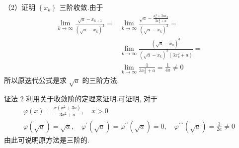 \begin{tcolorbox}[enhanced,colback=8,colframe=7,breakable,coltitle=green!25!black,title=2024]
（2）证明 $ \left\{x_{k}\right\} $ 三阶收敛.由于
$$
\begin{aligned}
\lim _{k \rightarrow \infty} \frac{\sqrt{a}-x_{k+1}}{\left(\sqrt{a}-x_{k}\right)^{3}}= & \lim _{k \rightarrow \infty} \frac{\sqrt{a}-\frac{x_{k}^{3}+3 a x_{k}}{3 x_{k}^{2}+a}}{\left(\sqrt{a}-x_{k}\right)^{3}}= \\
& \lim _{k \rightarrow \infty} \frac{\left(\sqrt{a}-x_{k}\right)^{3}}{\left(\sqrt{a}-x_{k}\right)^{3}\left(3 x_{k}^{2}+a\right)}= \\
& \lim _{k \rightarrow \infty} \frac{1}{3 x_{k}^{2}+a}=\frac{1}{4 a} \neq 0
\end{aligned}
$$
所以原迭代公式是求 $ \sqrt{a} $ 的三阶方法.

证法 2 \; 利用关于收敛阶的定理来证明.可证明, 对于
$$
\begin{array}{c}
\varphi(x)=\frac{x\left(x^{2}+3 a\right)}{3 x^{2}+a}, \quad x>0 \\
\varphi(\sqrt{a})=\sqrt{a}, \quad \varphi^{\prime}(\sqrt{a})=\varphi^{\prime \prime}(\sqrt{a})=0, \quad \varphi^{\prime \prime \prime}(\sqrt{a})=\frac{3}{2 a} \neq 0
\end{array}
$$
由此可说明原方法是三阶的.
 \end{tcolorbox}



